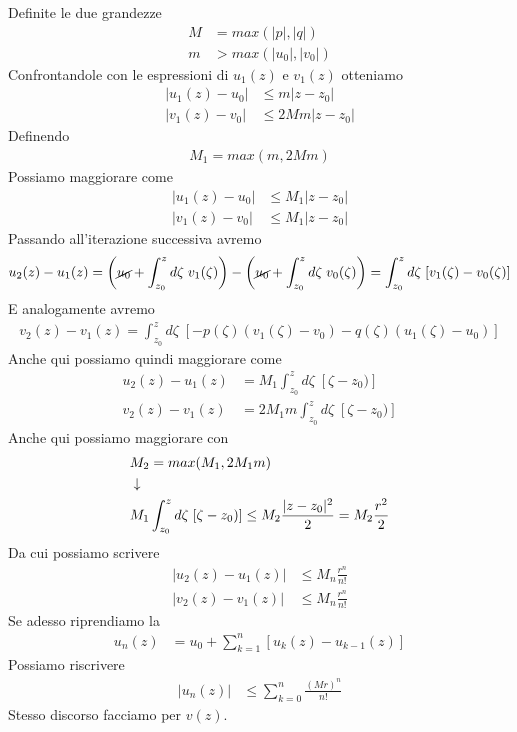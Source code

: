 Definite le due grandezze
\begin{align}
	M &= max(|p|,|q|)\\
	m &> max(|u_0|,|v_0|)
\end{align}
Confrontandole con le espressioni di $u_1(z)$ e $v_1(z)$ otteniamo
\begin{align}
	|u_1(z) - u_0| &\leq m |z-z_0|\\
	|v_1(z) - v_0| &\leq 2Mm |z-z_0|	
\end{align}
Definendo
\begin{align}
	M_1 = max(m, 2Mm)
\end{align}
Possiamo maggiorare come
\begin{align}
	|u_1(z) - u_0| &\leq M_1 |z-z_0|\\
	|v_1(z) - v_0| &\leq M_1 |z-z_0|	
\end{align}
Passando all'iterazione successiva avremo
\begin{align}
	u_2(z) - u_1(z) = \left(\cancel{u_0} + \int_{z_0}^{z} d\zeta \; v_1(\zeta) \right) - \left(\cancel{u_0} + \int_{z_0}^{z} d\zeta \; v_0(\zeta) \right) = \int_{z_0}^{z} d\zeta \; [v_1(\zeta) - v_0(\zeta)]
\end{align}
E analogamente avremo
\begin{align}
	v_2(z) - v_1(z) = \int_{z_0}^{z} d\zeta\; [-p(\zeta) (v_1(\zeta)-v_0) - q(\zeta)(u_1(\zeta)-u_0)]
\end{align}
Anche qui possiamo quindi maggiorare come
\begin{align}
	u_2(z) - u_1(z) &= M_1\int_{z_0}^{z} d\zeta\; [\zeta - z_0)]\\
	v_2(z) - v_1(z) &= 2M_1m\int_{z_0}^{z} d\zeta\; [\zeta - z_0)]
\end{align}
Anche qui possiamo maggiorare con
\begin{align}
	&M_2 = max(M_1, 2M_1 m) \\ &\downarrow \nonumber \\
	&M_1\int_{z_0}^{z} d\zeta\; [\zeta - z_0)] \leq M_2 \frac{|z-z_0|^2}{2} = M_2 \frac{r^2}{2}
\end{align}
Da cui possiamo scrivere
\begin{align}
	|u_2(z) - u_1(z)| &\leq M_n \frac{r^n}{n!}\\
	|v_2(z) - v_1(z)| &\leq M_n \frac{r^n}{n!}	
\end{align}
Se adesso riprendiamo la
\begin{align}
	u_n(z) &= u_0 + \sum_{k=1}^{n} [u_{k}(z) - u_{k-1}(z)]
\end{align}
Possiamo riscrivere
\begin{align}
	|u_n(z)| &\leq \sum_{k=0}^{n} \frac{(Mr)^n}{n!}
\end{align}
Stesso discorso facciamo per $v(z)$.

